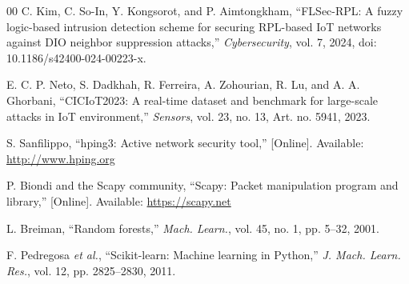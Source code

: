 \documentclass[conference]{IEEEtran}
\begin{document}
\begin{thebibliography}{00}
 C. Kim, C. So-In, Y. Kongsorot, and P. Aimtongkham, ``FLSec-RPL: A fuzzy logic-based intrusion detection scheme for securing RPL-based IoT networks against DIO neighbor suppression attacks,'' \emph{Cybersecurity}, vol. 7, 2024, doi: 10.1186/s42400-024-00223-x.

 E. C. P. Neto, S. Dadkhah, R. Ferreira, A. Zohourian, R. Lu, and A. A. Ghorbani, ``CICIoT2023: A real-time dataset and benchmark for large-scale attacks in IoT environment,'' \emph{Sensors}, vol. 23, no. 13, Art. no. 5941, 2023.

 S. Sanfilippo, ``hping3: Active network security tool,'' [Online]. Available: \url{http://www.hping.org}

 P. Biondi and the Scapy community, ``Scapy: Packet manipulation program and library,'' [Online]. Available: \url{https://scapy.net}

 L. Breiman, ``Random forests,'' \emph{Mach. Learn.}, vol. 45, no. 1, pp. 5--32, 2001.

 F. Pedregosa \emph{et al.}, ``Scikit-learn: Machine learning in Python,'' \emph{J. Mach. Learn. Res.}, vol. 12, pp. 2825--2830, 2011.

\end{thebibliography}
\end{document}
